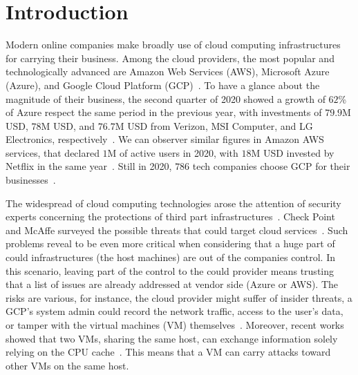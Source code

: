 \chapter{Introduction} %
\label{chp:introduction} 


Modern online companies make broadly use of cloud computing infrastructures for 
carrying their business.
Among the cloud providers, the most popular and technologically advanced 
are Amazon Web Services (AWS), Microsoft Azure (Azure), and Google Cloud 
Platform (GCP)~\citep{flexera_report}.
To have a glance about the magnitude of their business, the second quarter of 
2020 showed a growth of $62$\% of Azure respect the same period in the 
previous year, with investments of $79.9$M USD, $78$M 
USD, and $76.7$M USD from Verizon, MSI Computer, and LG Electronics, 
respectively~\citep{azure_business}.
We can observer similar figures in Amazon AWS services, that declared $1$M of 
active users in 2020, with $18$M USD invested by Netflix in the same 
year~\citep{aws_business}.
Still in 2020, $786$ tech companies choose GCP for their 
businesses~\citep{google_business}.

The widespread of cloud computing technologies arose the attention of security
experts concerning the protections of third part 
infrastructures~\citep{ryan2011cloud,sun2014data}.
Check Point and McAffe surveyed the possible threats that could target
cloud services~\citep{checkpoint_cloud,mcaffee_cloud}.
Such problems reveal to be even more critical when considering that a huge part 
of could infrastructures (\ie the host machines) are out of the companies 
control.
In this scenario, leaving part of the control to the could provider means 
trusting that a list of issues are already addressed at vendor side (\eg Azure 
or AWS).
The risks are various, for instance, the cloud provider might suffer 
of insider threats, \eg a GCP's system admin could record the network traffic, 
access to the user's data, or tamper with the 
virtual machines (VM) themselves~\citep{insider_threat}.
Moreover, recent works showed that two VMs, 
sharing the same host, can exchange information solely relying on the CPU 
cache~\citep{maurice2017hello}. This means that a VM can carry attacks 
toward other VMs on the same host.

